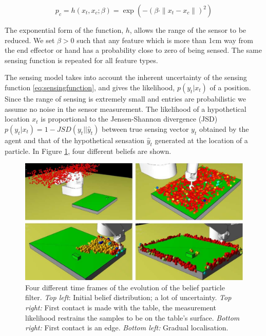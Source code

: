 \begin{equation}\label{eq:sensingfunction}
  p_c = h(x_t,x_c;\beta) = \exp\left( -\left(\beta \cdot \|x_t - x_c\|\right)^2 \right)
\end{equation}

The exponential form of the function, $h$, allows the range of the sensor to be reduced. We set $\beta > 0$ such that 
any feature which is more than 1cm way from the end effector or hand has a probability close to zero of being sensed. 
The same sensing function is repeated for all feature types.

The sensing model takes into account the inherent uncertainty of the sensing function \ref{eq:sensingfunction}, 
and gives the likelihood, $p(y_t|x_t)$ of a position. Since the range of sensing is extremely small and entries are probabilistic 
we assume no noise in the sensor measurement.
The likelihood of a hypothetical location $x_t$ is proportional to the Jensen-Shannon divergence (JSD) $p(y_t|x_t) = 1 - JSD(y_t||\hat{y}_t)$ between true sensing vector
$y_t$ obtained by the agent and that of the hypothetical sensation $\hat{y}_t$ generated at the location of a particle. In Figure \ref{fig:pf_example}, four 
different beliefs are shown.

\begin{figure}
  \centering
  \includegraphics[width=\textwidth]{./ch3-Search/Figures/particlefilter.pdf}
  \caption{Four different time frames of the evolution of the belief particle filter. \textit{Top left}: Initial belief distribution; a lot of uncertainty.
  \textit{Top right:} First contact is made with the table, the measurement likelihood restrains the samples to be on the table's surface. \textit{Bottom right:}
  First contact is an edge. \textit{Bottom left:} Gradual localisation.}
  \label{fig:pf_example}
\end{figure}

